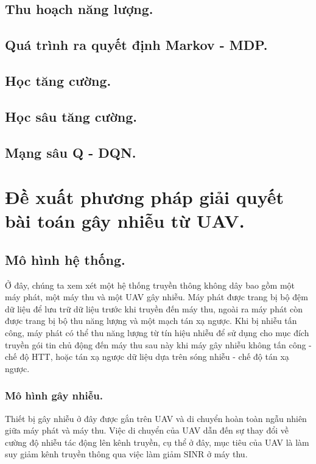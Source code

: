 \documentclass{uetgraduation}
\begin{document}
\section{Thu hoạch năng lượng.}

\section{Quá trình ra quyết định Markov - MDP.}

\section{Học tăng cường.}

\section{Học sâu tăng cường.}
\section{Mạng sâu Q - DQN.}

\chapter{Đề xuất phương pháp giải quyết bài toán gây nhiễu từ UAV.}
\section{Mô hình hệ thống.}
Ở đây, chúng ta xem xét một hệ thống truyền thông không dây bao gồm một máy phát, một máy thu và một UAV gây nhiễu. Máy phát được trang bị bộ đệm dữ liệu để lưu
trữ dữ liệu trước khi truyền đến máy thu, ngoài ra máy phát còn được trang bị
bộ thu năng lượng và một mạch tán xạ ngược. Khi bị nhiễu tấn công, máy phát có thể thu năng lượng từ tín hiệu nhiễu để sử dụng cho mục đích truyền gói tin chủ
động đến máy thu sau này khi máy gây nhiễu không tấn công - chế độ HTT, hoặc tán xạ ngược dữ liệu dựa trên sóng nhiễu - chế độ tán xạ ngược.

\subsection{Mô hình gây nhiễu.}
Thiết bị gây nhiễu ở đây được gắn trên UAV và di chuyển hoàn toàn ngẫu nhiên giữa máy phát và máy thu. Việc di chuyển của UAV dẫn đến sự thay đổi về 
cường độ nhiễu tác động lên kênh truyền, cụ thể ở đây, mục tiêu của UAV là làm suy giảm kênh truyền thông qua việc làm giảm SINR ở máy thu. 
\end{document}
